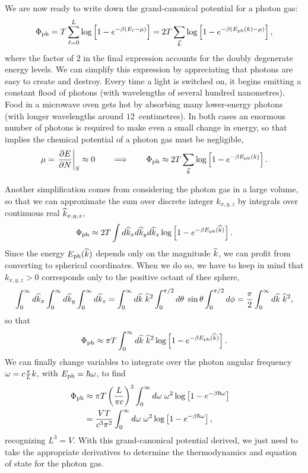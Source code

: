 We are now ready to write down the grand-canonical potential for a photon gas:
\begin{equation*}
  \Phi_{\text{ph}} = T \sum_{\ell = 0}^L \log\left[1 - e^{-\beta (E_{\ell} - \mu)}\right] = 2T \sum_{\vec k} \log\left[1 - e^{-\beta (E_{\text{ph}}(k) - \mu)}\right],
\end{equation*}
where the factor of $2$ in the final expression accounts for the doubly degenerate energy levels.
We can simplify this expression by appreciating that photons are easy to create and destroy.
Every time a light is switched on, it begins emitting a constant flood of photons (with wavelengths of several hundred nanometres).
Food in a microwave oven gets hot by absorbing many lower-energy photons (with longer wavelengths around $12$~centimetres).
In both cases an enormous number of photons is required to make even a small change in energy, so that  implies the chemical potential of a photon gas must be negligible,
\begin{equation*}
  \mu = \left.\frac{\partial E}{\partial N}\right|_S \approx 0 \qquad \Longrightarrow \qquad \Phi_{\text{ph}} \approx 2T \sum_{\vec k} \log\left[1 - e^{-\beta E_{\text{ph}}(k)}\right].
\end{equation*}

Another simplification comes from considering the photon gas in a large volume, so that we can approximate the sum over discrete integer $k_{x, y, z}$ by integrals over continuous real $\widehat k_{x, y, z}$,
\begin{equation*}
  \Phi_{\text{ph}} \approx 2T \int d\widehat k_x d\widehat k_y d\widehat k_z \log\left[1 - e^{-\beta E_{\text{ph}}(\widehat k)}\right].
\end{equation*}
Since the energy $E_{\text{ph}}(\widehat k)$ depends only on the magnitude $\widehat k$, we can profit from converting to spherical coordinates.
When we do so, we have to keep in mind that $k_{x, y, z} > 0$ corresponds only to the positive octant of thee sphere,
\begin{equation*}
  \int_0^{\infty} d\widehat k_x \int_0^{\infty} d\widehat k_y \int_0^{\infty} d\widehat k_z = \int_0^{\infty} d\widehat k \; \widehat k^2 \int_0^{\pi / 2} d\theta \; \sin\theta \int_0^{\pi / 2} d\phi = \frac{\pi}{2} \int_0^{\infty} d\widehat k \; \widehat k^2,
\end{equation*}
so that
\begin{equation*}
  \Phi_{\text{ph}} \approx \pi T \int_0^{\infty} d\widehat k \; \widehat k^2 \log\left[1 - e^{-\beta E_{\text{ph}}(\widehat k)}\right].
\end{equation*}
We can finally change variables to integrate over the photon angular frequency $\omega = c \frac{\pi}{L} k$, with $E_{\text{ph}} = \hbar \omega$, to find
\begin{align}
  \Phi_{\text{ph}} & \approx \pi T \left(\frac{L}{\pi c}\right)^3 \int_0^{\infty} d\omega \; \omega^2 \log\left[1 - e^{-\beta \hbar \omega}\right] \cr
                   & = \frac{VT}{c^3 \pi^2} \int_0^{\infty} d\omega \; \omega^2 \log\left[1 - e^{-\beta \hbar \omega}\right], \label{eq:photon_grand}
\end{align}
recognizing $L^3 = V$.
With this grand-canonical potential derived, we just need to take the appropriate derivatives to determine the thermodynamics and equation of state for the photon gas.



